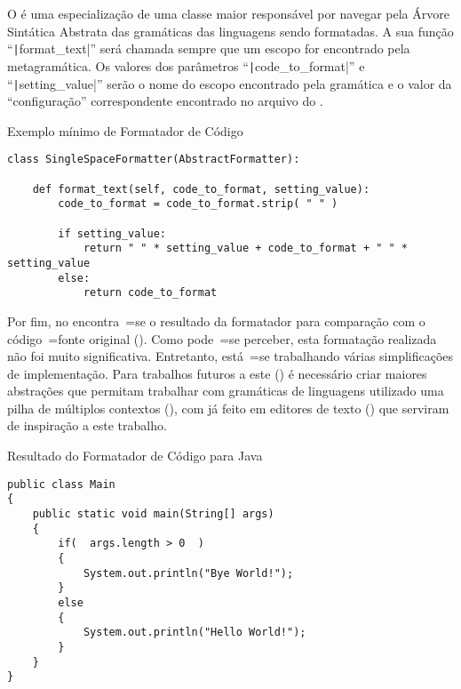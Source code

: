 O  é uma especialização de uma classe maior responsável por navegar pela Árvore Sintática Abstrata das gramáticas das linguagens sendo formatadas.
A sua função ``\texttt|format_text|'' será chamada sempre que um escopo for encontrado pela metagramática.
Os valores dos parâmetros ``\texttt|code_to_format|'' e
``\texttt|setting_value|'' serão o nome do escopo encontrado pela gramática e
o valor da ``configuração'' correspondente encontrado no arquivo do .
\begin{code}
\caption{Exemplo mínimo de Formatador de Código}
\label{code:exemploMinimoDeFormatadorDeCodigo}
\begin{verbatim}
class SingleSpaceFormatter(AbstractFormatter):

    def format_text(self, code_to_format, setting_value):
        code_to_format = code_to_format.strip( " " )

        if setting_value:
            return " " * setting_value + code_to_format + " " * setting_value
        else:
            return code_to_format
\end{verbatim}
\end{code}

Por fim,
no  encontra~=se o resultado da formatador para comparação com o código~=fonte original ().
Como pode~=se perceber,
esta formatação realizada não foi muito significativa.
Entretanto,
está~=se trabalhando várias simplificações de implementação.
Para trabalhos futuros a este () é necessário criar maiores abstrações que permitam trabalhar com gramáticas de linguagens utilizado uma pilha de múltiplos contextos (),
com já feito em editores de texto () que serviram de inspiração a este trabalho.
\begin{code}
\caption{Resultado do Formatador de Código para Java}
\label{code:resultadoDoFormatadorDeCodigoParaJava}
\begin{verbatim}
public class Main
{
    public static void main(String[] args)
    {
        if(  args.length > 0  )
        {
            System.out.println("Bye World!");
        }
        else
        {
            System.out.println("Hello World!");
        }
    }
}
\end{verbatim}
\end{code}

